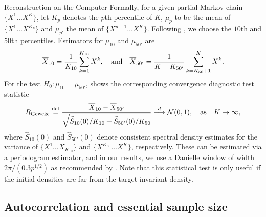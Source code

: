 \begin{chapter}{Reconstruction on the Computer}
Formally, for a given partial Markov chain $\{X^1\dots X^K\}$, let $K_p$ denotes the $p$th percentile of $K$, $\mu_p$ to be the mean of $\{X^1\dots X^{K_p}\}$ and $\mu_{p'}$ the mean of $\{X^{p+1}\dots X^K\}$.
Following \citep{geweke1991evaluating}, we choose the $10$th and $50$th percentiles.
Estimators for $\mu_{10}$ and $\mu_{50'}$ are
\begin{equation}
  \bar X_{10}=\frac{1}{K_{10}}\sum_{k=1}^{K_{10}}X^k,\quad{\rm and}\quad\bar X_{50'}=\frac{1}{K-K_{50'}}\sum_{k=K_{50}+1}^K X^k.
\end{equation}
For the test $H_0:\mu_{10} = \mu_{50'}$, \citep{geweke1991evaluating} shows the corresponding convergence diagnostic test statistic 
\begin{equation}
\label{Geweke}
R_{\rm Geweke}\eqdef\frac{\bar X_{10}-\bar X_{50'}}{\sqrt{\hat S_{10}(0)/K_{10}+\hat S_{50'}(0)/K_{50}}}\stackrel{d}{\longrightarrow}\N(0,1),\quad{\rm as}\quad K\rightarrow\infty,
\end{equation}
where $\hat S_{10}(0)$ and $\hat S_{50'}(0)$ denote consistent spectral density estimates for the variance of $\{X^1\dots X_{K_10}\}$ and $\{X^{K_{50}}\dots X^K\}$, respectively. 
These can be estimated via a periodogram estimator, and in our results, we use a Danielle window of width $2\pi/(0.3p^{1/2})$ as recommended by \citep{geweke1991evaluating}.
Note that this statistical test is only useful if the initial densities are far from the target invariant density.

\subsection{Autocorrelation and essential sample size}


\end{chapter}
